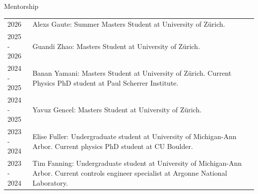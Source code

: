 \begin{rSection}{Mentorship}
\setlength{\extrarowheight}{3pt}
    \begin{longtable}{p{0.1\linewidth}p{0.9\linewidth}}
        2026 & Alexs Gaute: Summer Masters Student at University of Zürich.\\
        2025 - 2026 & Guandi Zhao: Masters Student at University of Zürich. \\
        2024 - 2025 & Banan Yamani: Masters Student at University of Zürich. Current Physics PhD student at Paul Scherrer Institute.\\
        2024 - 2025 & Yavuz Gencel: Masters Student at University of Zürich. \\
        2023 - 2024 & Elise Fuller: Undergraduate student at University of Michigan-Ann Arbor. Current physics PhD student at CU Boulder.\\
        2023 - 2024 & Tim Fanning: Undergraduate student at University of Michigan-Ann Arbor. Current controls engineer specialist at Argonne National Laboratory.\\
    \end{longtable}
\end{rSection}
